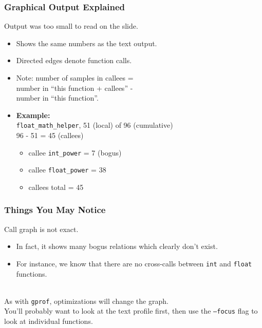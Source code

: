 \begin{frame}
  \frametitle{Graphical Output Explained}

  
  Output was too small to read on the slide.

  \begin{itemize}
    \item Shows the same numbers as the text output.
    \item Directed edges denote function calls.
    \item Note: number of samples in callees = \\
      \qquad number in ``this function + callees'' - \\
      \qquad number in ``this function''.\\
    \item {\bf Example:}\\
{{\tt float\_math\_helper}, 51 (local) of 96 (cumulative)} \\
      96 - 51 = 45 (callees)
      \begin{itemize}
        \item callee {\tt int\_power} = 7 (bogus)
        \item callee {\tt float\_power} = 38
        \item callees total = 45
      \end{itemize}

  \end{itemize}
  
\end{frame}

\begin{frame}
  \frametitle{Things You May Notice}

  
    Call graph is not exact.
    
      \begin{itemize}
        \item In fact, it shows many bogus relations which clearly don't exist.
        \item For instance, we know that there are no cross-calls between {\tt int} and {\tt float} functions.
      \end{itemize}~\\

    As with {\tt gprof}, optimizations will change the
      graph.\\[1em]

    You'll probably want to look at the text profile first, then use the
      {\tt --focus} flag to look at individual functions.
  
\end{frame}

